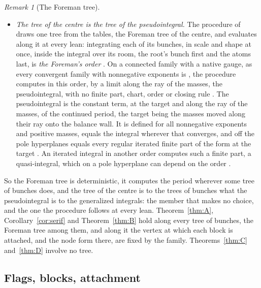 \documentclass[11pt]{article}
\theoremstyle{plain}
\theoremstyle{definition}
\theoremstyle{remark}
\newtheorem{rem}[prop]{Remark}
\begin{document}
\begin{rem}[The Foreman tree]
\begin{itemize}
\item \emph{The tree of the centre is the tree of the pseudointegral.} The procedure of \cite{F} draws one tree from the tables, the Foreman tree of the centre, and evaluates along it at every lean: integrating each of its bunches, in scale and shape at once, inside the integral over its room, the root's bunch first and the atoms last, is \emph{the Foreman's order} \cite[Def.~16.12, p.~97; Def.~16.26, p.~101]{F}. On a connected family with a native gauge, as every convergent family with nonnegative exponents is \cite[Thm.~8.18(iii), p.~58]{F}, the procedure computes in this order, by a limit along the ray of the masses, the pseudointegral, with no finite part, chart, order or closing rule \cite[Thm.~16.13, p.~98]{F}. The pseudointegral is the constant term, at the target and along the ray of the masses, of the continued period, the target being the masses moved along their ray onto the balance wall. It is defined for all nonnegative exponents and positive masses, equals the integral wherever that converges, and off the pole hyperplanes equals every regular iterated finite part of the form at the target \cite[Cor.~16.14, p.~98; Thm.~16.27, p.~102; Cor.~16.33, p.~105]{F}. An iterated integral in another order computes such a finite part, a quasi-integral, which on a pole hyperplane can depend on the order \cite[Thm.~16.21, p.~100; Cor.~16.33, p.~105]{F}.
\end{itemize}
So the Foreman tree is deterministic, it computes the period wherever some tree of bunches does, and the tree of the centre is to the trees of bunches what the pseudointegral is to the generalized integrals: the member that makes no choice, and the one the procedure follows at every lean. Theorem~\ref{thm:A}, Corollary~\ref{cor:serif} and Theorem~\ref{thm:B} hold along every tree of bunches, the Foreman tree among them, and along it the vertex at which each block is attached, and the node form there, are fixed by the family. Theorems~\ref{thm:C} and~\ref{thm:D} involve no tree.
\end{rem}

\subsection{Flags, blocks, attachment}
\end{document}
